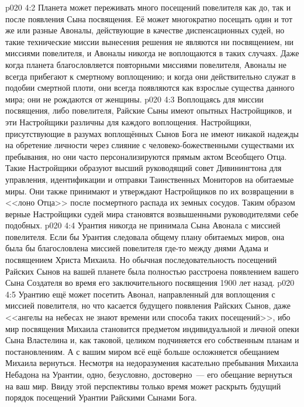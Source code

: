 \vs p020 4:2 Планета может переживать много посещений повелителя как до, так и после появления Сына посвящения. Её может многократно посещать один и тот же или разные Авоналы, действующие в качестве диспенсационных судей, но такие технические миссии вынесения решения не являются ни посвящением, ни миссиями повелителя, и Авоналы никогда не воплощаются в таких случаях. Даже когда планета благословляется повторными миссиями повелителя, Авоналы не всегда прибегают к смертному воплощению; и когда они действительно служат в подобии смертной плоти, они всегда появляются как взрослые существа данного мира; они не рождаются от женщины.
\vs p020 4:3 Воплощаясь для миссии посвящения, либо повелителя, Райские Сыны имеют опытных Настройщиков, и эти Настройщики различны для каждого воплощения. Настройщики, присутствующие в разумах воплощённых Сынов Бога не имеют никакой надежды на обретение личности через слияние с человеко\hyp{}божественными существами их пребывания, но они часто персонализируются прямым актом Всеобщего Отца. Такие Настройщики образуют высший руководящий совет Дивинингтона для управления, идентификации и отправки Таинственных Мониторов на обитаемые миры. Они также принимают и утверждают Настройщиков по их возвращении в <<лоно Отца>> после посмертного распада их земных сосудов. Таким образом верные Настройщики судей мира становятся возвышенными руководителями себе подобных.
\vs p020 4:4 \pc Урантия никогда не принимала Сына Авонала с миссией повелителя. Если бы Урантия следовала общему плану обитаемых миров, она была бы благословлена миссией повелителя где\hyp{}то между днями Адама и посвящением Христа Михаила. Но обычная последовательность посещений Райских Сынов на вашей планете была полностью расстроена появлением вашего Сына Создателя во время его заключительного посвящения 1900 лет назад.
\vs p020 4:5 Урантию ещё может посетить Авонал, направленный для воплощения с миссией повелителя, но что касается будущего появления Райских Сынов, даже <<ангелы на небесах не знают времени или способа таких посещений>>, ибо мир посвящения Михаила становится предметом индивидуальной и личной опеки Сына Властелина и, как таковой, целиком подчиняется его собственным планам и постановлениям. А с вашим миром всё ещё больше осложняется обещанием Михаила вернуться. Несмотря на недоразумения касательно пребывания Михаила Небадона на Урантии, одно, безусловно, достоверно~--- его обещание вернуться на ваш мир. Ввиду этой перспективы только время может раскрыть будущий порядок посещений Урантии Райскими Сынами Бога.
